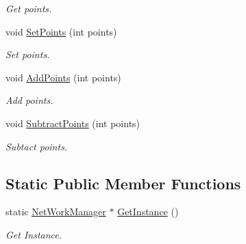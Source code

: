 \begin{DoxyCompactItemize}
\begin{DoxyCompactList}\small\item\em Get points. \end{DoxyCompactList}\item 
\mbox{\label{class_net_work_manager_adc717828d724dd237570783ae810285d}} 
void \hyperlink{class_net_work_manager_adc717828d724dd237570783ae810285d}{Set\+Points} (int points)
\begin{DoxyCompactList}\small\item\em Set points. \end{DoxyCompactList}\item 
\mbox{\label{class_net_work_manager_aaa905d23fb51701037a374761b6f629e}} 
void \hyperlink{class_net_work_manager_aaa905d23fb51701037a374761b6f629e}{Add\+Points} (int points)
\begin{DoxyCompactList}\small\item\em Add points. \end{DoxyCompactList}\item 
\mbox{\label{class_net_work_manager_afb82cb5c66b06b0d0ed07d5b816e2531}} 
void \hyperlink{class_net_work_manager_afb82cb5c66b06b0d0ed07d5b816e2531}{Subtract\+Points} (int points)
\begin{DoxyCompactList}\small\item\em Subtact points. \end{DoxyCompactList}\end{DoxyCompactItemize}
\subsection*{Static Public Member Functions}
\begin{DoxyCompactItemize}
\item 
\mbox{\label{class_net_work_manager_ad2c1d65fe860b96f27cd754618740654}} 
static \hyperlink{class_net_work_manager}{Net\+Work\+Manager} $\ast$ \hyperlink{class_net_work_manager_ad2c1d65fe860b96f27cd754618740654}{Get\+Instance} ()
\begin{DoxyCompactList}\small\item\em Get Instance. \end{DoxyCompactList}\end{DoxyCompactItemize}
